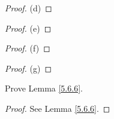 \begin{proof}{(d)}

\end{proof}

\begin{proof}{(e)}

\end{proof}

\begin{proof}{(f)}

\end{proof}

\begin{proof}{(g)}

\end{proof}

\exercisesection

\begin{exercise}\label{ex 5.6.1}
Prove Lemma \ref{5.6.6}.
\end{exercise}

\begin{proof}
See Lemma \ref{5.6.6}.
\end{proof}